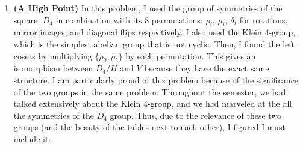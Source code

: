 \begin{enumerate}[label=\textbf{\arabic*.}]
    \begin{problem}
        Prove that if \(D\) is an integral domain, then \(D[x]\) is an integral domain.
    \end{problem}

    \newpage
    \item \textbf{(A High Point)} In this problem, I used the group of symmetries of the square, \(D_{4}\) in combination with its 8 permutations: \(\rho_{i}\), \(\mu_{i}\), \(\delta_{i}\) for rotations, mirror images, and diagonal flips respectively. I also used the Klein 4-group, which is the simplest abelian group that is not cyclic. Then, I found the left cosets by multiplying \(\{\rho_{0}, \rho_{2}\}\) by each permutation. This gives an isomorphism between \(D_{4}/H\) and \(V\) because they have the exact same structure. I am particularly proud of this problem because of the significance of the two groups in the same problem. Throughout the semester, we had talked extensively about the Klein 4-group, and we had marveled at the all the symmetries of the \(D_{4}\) group. Thus, due to the relevance of these two groups (and the beauty of the tables next to each other), I figured I must include it.


\end{enumerate}

